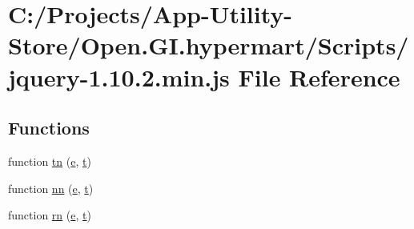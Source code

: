 \hypertarget{_scripts_2jquery-1_810_82_8min_8js}{}\section{C\+:/\+Projects/\+App-\/\+Utility-\/\+Store/\+Open.G\+I.\+hypermart/\+Scripts/jquery-\/1.10.2.min.\+js File Reference}
\label{_scripts_2jquery-1_810_82_8min_8js}
\subsection*{Functions}
\begin{DoxyCompactItemize}
\item 
function \hyperlink{_scripts_2jquery-1_810_82_8min_8js_a9372ffea5788fa8dc44b8fc18aba3118}{tn} (\hyperlink{_scripts_2respond_8min_8js_a2c038346d47955cbe2cb91e338edd7e1}{e}, \hyperlink{_scripts_2jquery_8validate_8min_8js_a23c5666e83bbbceee94adcd0851f50c4}{t})
\item 
function \hyperlink{_scripts_2jquery-1_810_82_8min_8js_a11655b827ec323fed5b6a764f93b9ece}{nn} (\hyperlink{_scripts_2respond_8min_8js_a2c038346d47955cbe2cb91e338edd7e1}{e}, \hyperlink{_scripts_2jquery_8validate_8min_8js_a23c5666e83bbbceee94adcd0851f50c4}{t})
\item 
function \hyperlink{_scripts_2jquery-1_810_82_8min_8js_a683a60c6ff4ff96a79f34e54fc8cc972}{rn} (\hyperlink{_scripts_2respond_8min_8js_a2c038346d47955cbe2cb91e338edd7e1}{e}, \hyperlink{_scripts_2jquery_8validate_8min_8js_a23c5666e83bbbceee94adcd0851f50c4}{t})
\item 

\end{DoxyCompactItemize}
